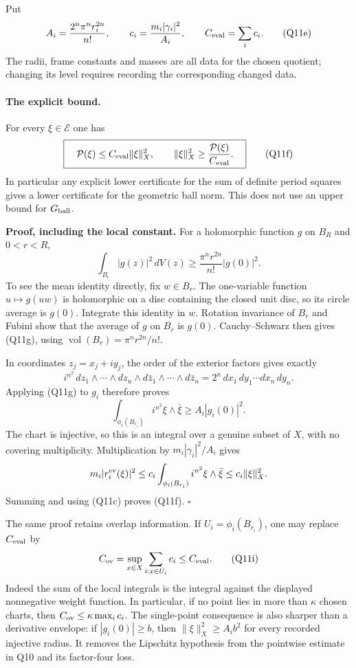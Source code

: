 \documentclass[11pt]{article}
\theoremstyle{definition}\newtheorem{definition}[theorem]{Definition}\newtheorem{remark}[theorem]{Remark}
\begin{document}
Put
\[
 A_i=\frac{2^n\pi^n r_i^{2n}}{n!},\qquad
 c_i=\frac{m_i|\gamma_i|^2}{A_i},\qquad
 C_{\rm eval}=\sum_i c_i.
 \tag{Q11e}
\]
The radii, frame constants and masses are all data for the
chosen quotient; changing its level requires recording the
corresponding changed data.

\paragraph{The explicit bound.}
For every $\xi\in\mathcal E$ one has
\[
 \boxed{\quad
       \mathcal P(\xi)\leq C_{\rm eval}\|\xi\|_X^2,
       \qquad
       \|\xi\|_X^2\geq
                \frac{\mathcal P(\xi)}{C_{\rm eval}}.
       \quad}
 \tag{Q11f}
\]
In particular any explicit lower certificate for the sum of
definite period squares gives a lower certificate for the
geometric ball norm.  This does not use an upper bound for
$G_{\rm ball}$.

\textbf{Proof, including the local constant.}
For a holomorphic function $g$ on $B_R$ and $0<r<R$,
\[
       \int_{B_r}|g(z)|^2\,dV(z)
          \geq \frac{\pi^n r^{2n}}{n!}|g(0)|^2.
 \tag{Q11g}
\]
To see the mean identity directly, fix $w\in B_r$.  The
one-variable function $u\mapsto g(uw)$ is holomorphic on a
disc containing the closed unit disc, so its circle average is
$g(0)$.  Integrate this identity in $w$.  Rotation invariance
of $B_r$ and Fubini show that the average of $g$ on $B_r$ is
$g(0)$.  Cauchy--Schwarz then gives (Q11g), using
$\operatorname{vol}(B_r)=\pi^nr^{2n}/n!$.

In coordinates $z_j=x_j+iy_j$, the order of the exterior
factors gives exactly
\[
 i^{n^2}\,dz_1\wedge\cdots\wedge dz_n\wedge
        d\bar z_1\wedge\cdots\wedge d\bar z_n
        =2^n\,dx_1\,dy_1\cdots dx_n\,dy_n.
\]
Applying (Q11g) to $g_i$ therefore proves
\[
 \int_{\phi_i(B_{r_i})}i^{n^2}\xi\wedge\bar\xi
          \geq A_i |g_i(0)|^2.
 \tag{Q11h}
\]
The chart is injective, so this is an integral over a genuine
subset of $X$, with no covering multiplicity.  Multiplication
by $m_i|\gamma_i|^2/A_i$ gives
\[
 m_i|r_i^{\rm ev}(\xi)|^2
       \leq c_i\int_{\phi_i(B_{r_i})}i^{n^2}\xi\wedge\bar\xi
       \leq c_i\|\xi\|_X^2.
\]
Summing and using (Q11c) proves (Q11f).
\hfill$\square$

The same proof retains overlap information.  If
$U_i=\phi_i(B_{r_i})$, one may replace $C_{\rm eval}$ by
\[
 C_{\rm ov}=\sup_{x\in X}\sum_{i:x\in U_i}c_i
         \leq C_{\rm eval}.
 \tag{Q11i}
\]
Indeed the sum of the local integrals is the integral against
the displayed nonnegative weight function.  In particular,
if no point lies in more than $\kappa$ chosen charts, then
$C_{\rm ov}\leq\kappa\max_i c_i$.
The single-point consequence is also sharper than a derivative
envelope: if $|g_i(0)|\geq b$, then
$\|\xi\|_X^2\geq A_i b^2$ for every recorded injective radius.
It removes the Lipschitz hypothesis from the pointwise estimate
in Q10 and its factor-four loss.
\end{document}
